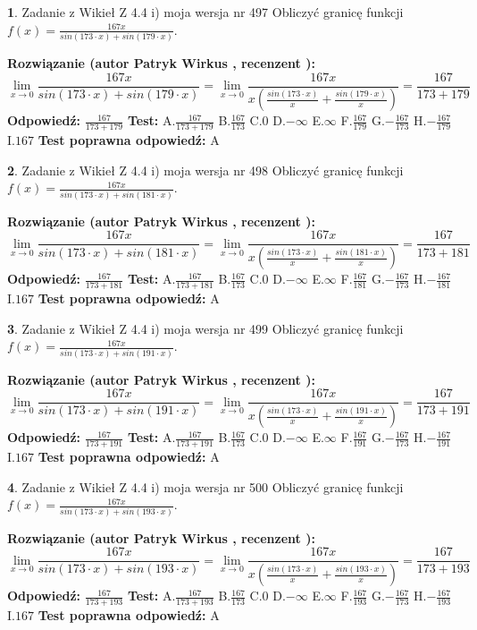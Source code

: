 \documentclass[12pt, a4paper]{article}
\theoremstyle{definition} %
\newtheorem{zad}{}
\newcommand{\zadStart}[1]{\begin{zad}#1\newline}
\newcommand{\zadStop}{\end{zad}}
\newcommand{\rozwStart}[2]{\noindent \textbf{Rozwiązanie (autor #1 , recenzent #2): }\newline}
\newcommand{\rozwStop}{\newline}
\newcommand{\odpStart}{\noindent \textbf{Odpowiedź:}\newline}
\newcommand{\odpStop}{\newline}
\newcommand{\testStart}{\noindent \textbf{Test:}\newline}
\newcommand{\testStop}{\newline}
\newcommand{\kluczStart}{\noindent \textbf{Test poprawna odpowiedź:}\newline}
\newcommand{\kluczStop}{\newline}
\begin{document}
\zadStart{Zadanie z Wikieł Z 4.4 i) moja wersja nr 497}
Obliczyć granicę funkcji $f(x)=\frac{167x}{sin(173\cdot x) +sin(179\cdot x)}$.
\zadStop
\rozwStart{Patryk Wirkus}{}
$$\lim\limits_{x\to 0}\frac{167x}{sin(173\cdot x) +sin(179\cdot x)}=\lim\limits_{x\to 0}\frac{167x}{x(\frac{sin(173\cdot x)}{x}+\frac{sin(179\cdot x)}{x})}=\frac{167}{173+179}$$
\rozwStop
\odpStart
$\frac{167}{173+179}$
\odpStop
\testStart
A.$\frac{167}{173+179}$
B.$\frac{167}{173}$
C.$0$
D.$-\infty$
E.$\infty$
F.$\frac{167}{179}$
G.$-\frac{167}{173}$
H.$-\frac{167}{179}$
I.$167$
\testStop
\kluczStart
A
\kluczStop



\zadStart{Zadanie z Wikieł Z 4.4 i) moja wersja nr 498}
Obliczyć granicę funkcji $f(x)=\frac{167x}{sin(173\cdot x) +sin(181\cdot x)}$.
\zadStop
\rozwStart{Patryk Wirkus}{}
$$\lim\limits_{x\to 0}\frac{167x}{sin(173\cdot x) +sin(181\cdot x)}=\lim\limits_{x\to 0}\frac{167x}{x(\frac{sin(173\cdot x)}{x}+\frac{sin(181\cdot x)}{x})}=\frac{167}{173+181}$$
\rozwStop
\odpStart
$\frac{167}{173+181}$
\odpStop
\testStart
A.$\frac{167}{173+181}$
B.$\frac{167}{173}$
C.$0$
D.$-\infty$
E.$\infty$
F.$\frac{167}{181}$
G.$-\frac{167}{173}$
H.$-\frac{167}{181}$
I.$167$
\testStop
\kluczStart
A
\kluczStop



\zadStart{Zadanie z Wikieł Z 4.4 i) moja wersja nr 499}
Obliczyć granicę funkcji $f(x)=\frac{167x}{sin(173\cdot x) +sin(191\cdot x)}$.
\zadStop
\rozwStart{Patryk Wirkus}{}
$$\lim\limits_{x\to 0}\frac{167x}{sin(173\cdot x) +sin(191\cdot x)}=\lim\limits_{x\to 0}\frac{167x}{x(\frac{sin(173\cdot x)}{x}+\frac{sin(191\cdot x)}{x})}=\frac{167}{173+191}$$
\rozwStop
\odpStart
$\frac{167}{173+191}$
\odpStop
\testStart
A.$\frac{167}{173+191}$
B.$\frac{167}{173}$
C.$0$
D.$-\infty$
E.$\infty$
F.$\frac{167}{191}$
G.$-\frac{167}{173}$
H.$-\frac{167}{191}$
I.$167$
\testStop
\kluczStart
A
\kluczStop



\zadStart{Zadanie z Wikieł Z 4.4 i) moja wersja nr 500}
Obliczyć granicę funkcji $f(x)=\frac{167x}{sin(173\cdot x) +sin(193\cdot x)}$.
\zadStop
\rozwStart{Patryk Wirkus}{}
$$\lim\limits_{x\to 0}\frac{167x}{sin(173\cdot x) +sin(193\cdot x)}=\lim\limits_{x\to 0}\frac{167x}{x(\frac{sin(173\cdot x)}{x}+\frac{sin(193\cdot x)}{x})}=\frac{167}{173+193}$$
\rozwStop
\odpStart
$\frac{167}{173+193}$
\odpStop
\testStart
A.$\frac{167}{173+193}$
B.$\frac{167}{173}$
C.$0$
D.$-\infty$
E.$\infty$
F.$\frac{167}{193}$
G.$-\frac{167}{173}$
H.$-\frac{167}{193}$
I.$167$
\testStop
\kluczStart
A
\kluczStop
\end{document}

